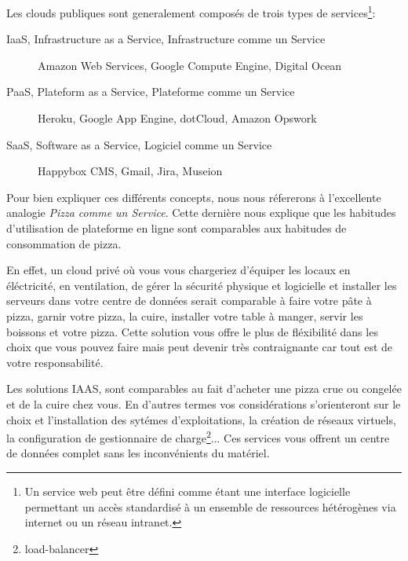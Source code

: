 \documentclass[11pt, a4paper ]{article}
\begin{document}
\begin{spacing}{1.5}
Les clouds publiques sont generalement composés de trois types de services\footnote{Un service web\cite{webServicesDef} peut être défini comme étant une interface logicielle permettant un accès standardisé à un ensemble de ressources hétérogènes via internet ou un réseau intranet.}:
\begin{description}

	\item[IaaS, Infrastructure as a Service, Infrastructure comme un Service] Amazon Web Services, Google Compute Engine, Digital Ocean

	\item[PaaS, Plateform as a Service, Plateforme comme un Service] Heroku, Google App Engine, dotCloud, Amazon Opswork

	\item[SaaS, Software as a Service, Logiciel comme un Service]
	Happybox CMS, Gmail, Jira, Museion

\end{description}

Pour bien expliquer ces différents concepts, nous nous réfererons à l'excellente analogie \emph{Pizza comme un Service}\cite{PizzaasaService}. Cette dernière nous explique que les habitudes d'utilisation de plateforme en ligne sont comparables aux habitudes de consommation de pizza.

En effet, un cloud privé où vous vous chargeriez d'équiper les locaux en éléctricité, en ventilation, de gérer la sécurité physique et logicielle et installer les serveurs dans votre centre de données serait comparable à faire votre pâte à pizza, garnir votre pizza, la cuire, installer votre table à manger, servir les boissons et votre pizza. Cette solution vous offre le plus de fléxibilité dans les choix que vous pouvez faire mais peut devenir très contraignante car tout est de votre responsabilité.

Les solutions IAAS, sont comparables au fait d'acheter une pizza crue ou congelée et de la cuire chez vous. En d'autres termes vos considérations s'orienteront sur le choix et l'installation des sytémes d'exploitations, la création de réseaux virtuels, la configuration de gestionnaire de charge\footnote{load-balancer}... Ces services vous offrent un centre de données complet sans les inconvénients du matériel.


\end{spacing}
\end{document}
